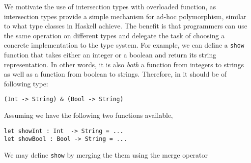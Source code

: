 We motivate the use of intersection types with overloaded function, as
intersection types provide a simple mechanism for ad-hoc polymorphism, similar
to what type classes in Haskell achieve. The benefit is that programmers can use
the same operation on different types and delegate the task of choosing a
concrete implementation to the type system. For example, we can define a
\lstinline{show} function that takes either an integer or a boolean and return
its string representation. In other words, it is also \emph{both} a function
from integers to strings as well as a function from boolean to strings.
Therefore, in \name it should be of following type:
\begin{lstlisting}
(Int -> String) & (Bool -> String)
\end{lstlisting}
Assuming we have the following two functions available,
\begin{lstlisting}
let showInt : Int  -> String = ...
let showBool : Bool -> String = ...
\end{lstlisting}
We may define \lstinline{show} by merging the them using the merge operator
